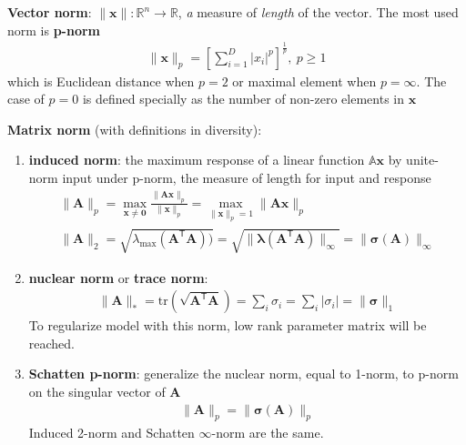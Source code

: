 \textbf{Vector norm}:
$\|\bm{x}\|:\mathbb{R}^n\to\mathbb{R}$, \textit{a} measure of \textit{length} of the vector.
The most used norm is \textbf{p-norm}
\begin{gather}
    \|\bm{x}\|_p=\left[\sum_{i=1}^D |x_i|^p\right]^\frac{1}{p},~p\geq{1}
\end{gather}
which is Euclidean distance when $p=2$ or maximal element when $p=\infty$. 
The case of $p=0$ is defined specially as the number of non-zero elements in $\bm{x}$

\textbf{Matrix norm} (with definitions in diversity):
\begin{enumerate}[{(1)}]
    \item \textbf{induced norm}: 
    the maximum response of a linear function $\mathbb{A}\bm{x}$ by unite-norm input under p-norm, the measure of length for input and response 
    \begin{gather}
        \|\mathbf{A}\|_p
        = \max_{\bm{x}\neq\bm{0}}\frac{\|\mathbf{A}\bm{x}\|_p}{\|\bm{x}\|_p}
        = \max_{\|\bm{x}\|_p=1}\|\mathbf{A}\bm{x}\|_p\\
        \|\mathbf{A}\|_2
        = \sqrt{\lambda_{\text{max}}(\mathbf{A}^\mathsf{T}\mathbf{A}))}
        = \sqrt{\|\bm{\lambda}(\mathbf{A}^\mathsf{T}\mathbf{A})\|_\infty}
        = \|\bm{\sigma}(\mathbf{A})\|_\infty
    \end{gather}
    
    \item \textbf{nuclear norm} or \textbf{trace norm}: 
    \begin{gather}
        \|\mathbf{A}\|_*
        = \mathrm{tr}(\sqrt{\mathbf{A}^\mathsf{T}\mathbf{A}})
        = \sum_i\sigma_i
        = \sum_i|\sigma_i|
        = \|\bm{\sigma}\|_1
    \end{gather}
    To regularize model with this norm, low rank parameter matrix will be reached.
    
    \item \textbf{Schatten p-norm}: generalize the nuclear norm, 
    equal to 1-norm, to p-norm on the singular vector of $\mathbf{A}$
    \begin{gather}
        \|\mathbf{A}\|_p=\|\bm{\sigma}(\mathbf{A})\|_p
    \end{gather}
    Induced 2-norm and Schatten $\infty$-norm are the same.
    

\end{enumerate}
